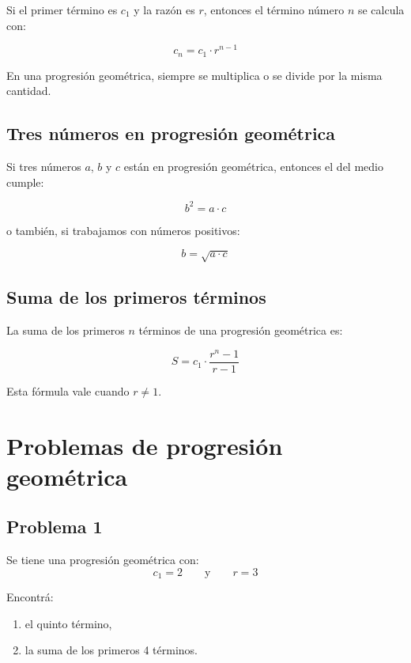 \documentclass[12pt]{article}
\newcommand{\observa}[1]{%
    \begin{tcolorbox}[colback=amarilloSuave, colframe=naranjaEureka, title=Observa y piensa]
    #1
    \end{tcolorbox}
}
\begin{document}
        \newpage
        Si el primer término es \(c_1\) y la razón es \(r\), entonces el término número \(n\) se calcula con:

        \[
        c_n=c_1\cdot r^{n-1}
        \]

        \begin{idea}
            En una progresión geométrica, siempre se multiplica o se divide por la misma cantidad.
        \end{idea}

        \subsection{Tres números en progresión geométrica}
            Si tres números \(a\), \(b\) y \(c\) están en progresión geométrica, entonces el del medio cumple:

            \[
            b^2=a\cdot c
            \]

            o también, si trabajamos con números positivos:

            \[
            b=\sqrt{a\cdot c}
            \]

        \subsection{Suma de los primeros términos}
            La suma de los primeros \(n\) términos de una progresión geométrica es:

            \[
            S=c_1\cdot \frac{r^n-1}{r-1}
            \]

            \observa{Esta fórmula vale cuando \(r\neq 1\).}

        \newpage
        \section{Problemas de progresión geométrica}
            \subsection{Problema 1}

            Se tiene una progresión geométrica con:
            \[
            c_1=2 \qquad \text{y} \qquad r=3
            \]

            \begin{desafio}
                Encontrá:

                \begin{enumerate}
                    \item el quinto término,
                    \item la suma de los primeros 4 términos.
                \end{enumerate}
            \end{desafio}
\end{document}
